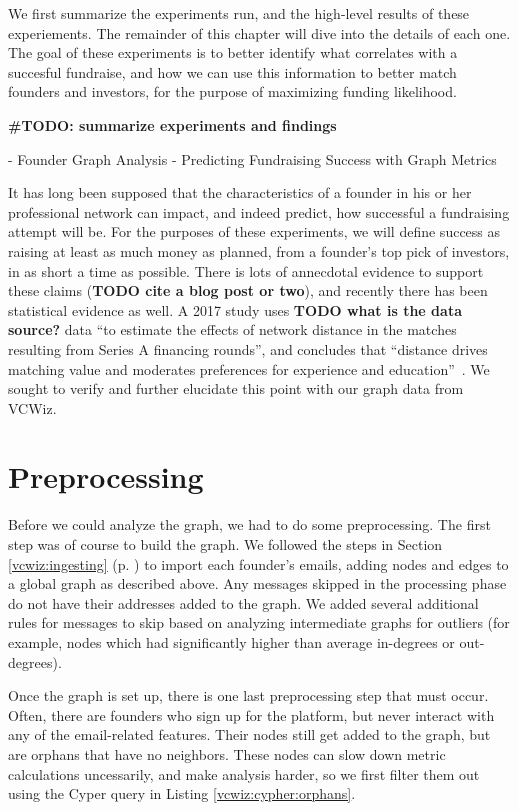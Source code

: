 We first summarize the experiments run, and the high-level results of these experiements. The remainder of this chapter will dive into the details of each one. The goal of these experiments is to better identify what correlates with a succesful fundraise, and how we can use this information to better match founders and investors, for the purpose of maximizing funding likelihood.

\textbf{\#TODO: summarize experiments and findings}

- Founder Graph Analysis
- Predicting Fundraising Success with Graph Metrics

It has long been supposed that the characteristics of a founder in his or her professional network can impact, and indeed predict, how successful a fundraising attempt will be. For the purposes of these experiments, we will define success as raising at least as much money as planned, from a founder's top pick of investors, in as short a time as possible. There is lots of annecdotal evidence to support these claims (\textbf{TODO cite a blog post or two}), and recently there has been statistical evidence as well. A 2017 study uses \textbf{TODO what is the data source?} data ``to estimate the effects of network distance in the matches resulting from Series A financing rounds'', and concludes that ``distance drives matching value and moderates preferences for experience and education''~\cite{pasquini2017matching}. We sought to verify and further elucidate this point with our graph data from VCWiz.

\section{Preprocessing}

Before we could analyze the graph, we had to do some preprocessing. The first step was of course to build the graph. We followed the steps in Section \ref{vcwiz:ingesting} (p. \pageref{vcwiz:ingesting}) to import each founder's emails, adding nodes and edges to a global graph as described above. Any messages skipped in the processing phase do not have their addresses added to the graph. We added several additional rules for messages to skip based on analyzing intermediate graphs for outliers (for example, nodes which had significantly higher than average in-degrees or out-degrees).

Once the graph is set up, there is one last preprocessing step that must occur. Often, there are founders who sign up for the platform, but never interact with any of the email-related features. Their nodes still get added to the graph, but are orphans that have no neighbors. These nodes can slow down metric calculations uncessarily, and make analysis harder, so we first filter them out using the Cyper query in Listing \ref{vcwiz:cypher:orphans}.

